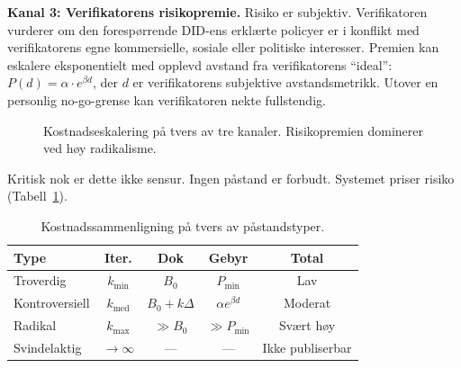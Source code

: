 \documentclass[11pt,a4paper,twocolumn]{article}
\begin{document}
\textbf{Kanal 3: Verifikatorens risikopremie.} Risiko er subjektiv. Verifikatoren vurderer om den forespørrende DID-ens erklærte policyer er i konflikt med verifikatorens egne kommersielle, sosiale eller politiske interesser. Premien kan eskalere eksponentielt med opplevd avstand fra verifikatorens ``ideal'': $P(d) = \alpha \cdot e^{\beta d}$, der $d$ er verifikatorens subjektive avstandsmetrikk. Utover en personlig no-go-grense kan verifikatoren nekte fullstendig.

\begin{figure}[ht]
\centering
{}
\caption{Kostnadseskalering på tvers av tre kanaler. Risikopremien dominerer ved høy radikalisme.}
\label{fig:radicalism}
\end{figure}

Kritisk nok er dette ikke sensur. Ingen påstand er forbudt. Systemet priser risiko (Tabell~\ref{tab:costs}).

\begin{table}[ht]
\centering
\caption{Kostnadssammenligning på tvers av påstandstyper.}
\label{tab:costs}
\footnotesize
\begin{tabular}{@{}lcccc@{}}
\toprule
\textbf{Type} & \textbf{Iter.} & \textbf{Dok} & \textbf{Gebyr} & \textbf{Total} \\
\midrule
Troverdig & $k_{\min}$ & $B_0$ & $P_{\min}$ & Lav \\
Kontroversiell & $k_{\text{med}}$ & $B_0{+}k\Delta$ & $\alpha e^{\beta d}$ & Moderat \\
Radikal & $k_{\max}$ & $\gg B_0$ & $\gg P_{\min}$ & Svært høy \\
Svindelaktig & $\to\infty$ & --- & --- & Ikke publiserbar \\
\bottomrule
\end{tabular}
\end{table}
\end{document}
